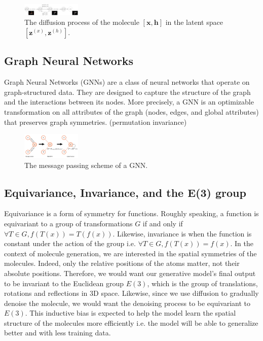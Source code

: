 \documentclass[sigconf]{acmart}
\begin{document}
\begin{figure}
    \centering
    \includegraphics[width=0.25\textwidth]{figures/diffusion.png}
    \caption{The diffusion process of the molecule $\left[ \mathbf{x}, \mathbf{h} \right]$ in the latent space $\left[ \mathbf{z}^{(x)}, \mathbf{z}^{(h)} \right]$.}
    \label{fig:diffusion}
\end{figure}

\subsection{Graph Neural Networks}
Graph Neural Networks (GNNs) are a class of neural networks that operate on graph-structured data.
They are designed to capture the structure of the graph and the interactions between its nodes.
More precisely, a GNN is an optimizable transformation on all attributes of the graph (nodes, edges, and global attributes) 
that preserves graph symmetries. (permutation invariance) \cite{gentle-intro-GNN}

\begin{figure}
    \centering
    \includegraphics[width=0.25\textwidth]{figures/message_passing.png}
    \caption{The message passing scheme of a GNN.}
    \label{fig:message-passing}
\end{figure}

\subsection{Equivariance, Invariance, and the E(3) group}
Equivariance is a form of symmetry for functions. Roughly speaking, a function is equivariant to a group of transformations $G$ 
if and only if $\forall T\in G, f(T(x)) = T(f(x))$.
Likewise, invariance is when the function is constant under the action of the group i.e. $\forall T\in G, f(T(x)) = f(x)$.
In the context of molecule generation, we are interested in the spatial symmetries of the molecules. Indeed, only the relative positions of the atoms matter, not their absolute positions.
Therefore, we would want our generative model's final output to be invariant to the Euclidean group $E(3)$, which is the group of translations, rotations and reflections in 3D space.
Likewise, since we use diffusion to gradually denoise the molecule, we would want the denoising process to be equivariant to $E(3)$.
This inductive bias is expected to help the model learn the spatial structure of the molecules more efficiently i.e. the model will be able to generalize better and with less training data.
\end{document}
